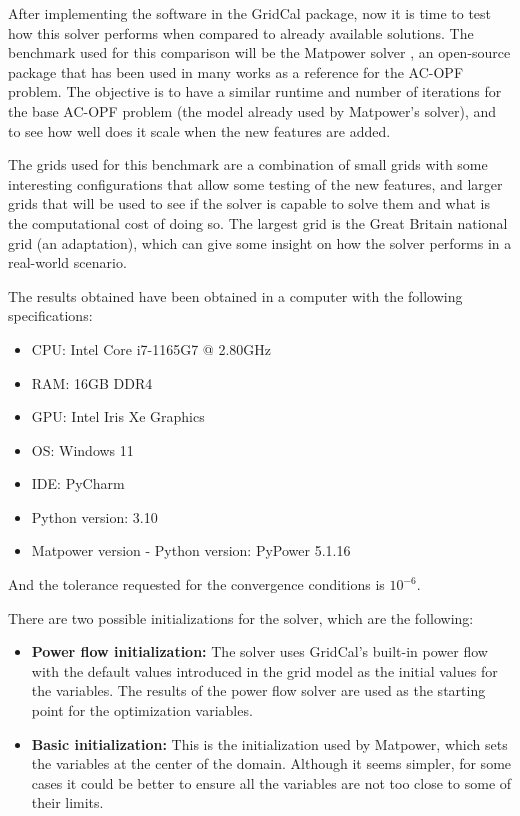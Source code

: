 
After implementing the software in the GridCal package, now it is time to test how this solver performs when compared to already available solutions. The benchmark used for this comparison will be the Matpower solver \cite{zimmerman2010matpower},
an open-source package that has been used in many works as a reference for the AC-OPF problem. The objective is to have a similar runtime and number of iterations for the base AC-OPF problem (the model already used by Matpower's solver),
and to see how well does it scale when the new features are added. 

The grids used for this benchmark are a combination of small grids with some interesting configurations that allow some testing of the new features, and larger grids that will be used to see if the solver is capable to solve them 
and what is the computational cost of doing so. The largest grid is the Great Britain national grid (an adaptation), which can give some insight on how the solver performs in a real-world scenario.

The results obtained have been obtained in a computer with the following specifications:

\begin{itemize}
    \item CPU: Intel Core i7-1165G7 @ 2.80GHz
    \item RAM: 16GB DDR4
    \item GPU: Intel Iris Xe Graphics
    \item OS: Windows 11
    \item IDE: PyCharm
    \item Python version: 3.10
    \item Matpower version - Python version: PyPower 5.1.16 \cite{zimmerman2010matpower} \cite{lincoln2023pypower}
\end{itemize}

And the tolerance requested for the convergence conditions is $10^{-6}$.

There are two possible initializations for the solver, which are the following:

\begin{itemize}
    \item \textbf{Power flow initialization:} The solver uses GridCal's built-in power flow with the default values introduced in the grid model as the initial values for the variables. The results of the power flow solver are used as the starting point for the optimization variables.
    \item \textbf{Basic initialization:} This is the initialization used by Matpower, which sets the variables at the center of the domain. Although it seems simpler, for some cases it could be better to ensure all the variables are not too close to some of their limits.
\end{itemize}

